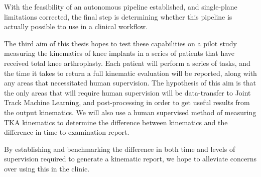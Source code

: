With the feasibility of an autonomous pipeline established, and single-plane limitations corrected, the final step is determining whether this pipeline is actually possible tto use in a clinical workflow.

The third aim of this thesis hopes to test these capabilities on a pilot study measuring the kinematics of knee implants in a series of patients that have received total knee arthroplasty. Each patient will perform a series of tasks, and the time it takes to return a full kinematic evaluation will be reported, along with any areas that necessitated human supervision. The hypothesis of this aim is that the only areas that will require human supervision will be data-transfer to Joint Track Machine Learning, and post-processing in order to get useful results from the output kinematics. We will also use a human supervised method of measuring TKA kinematics to determine the difference between kinematics and the difference in time to examination report.

By establishing and benchmarking the difference in both time and levels of supervision required to generate a kinematic report, we hope to alleviate concerns over using this in the clinic.